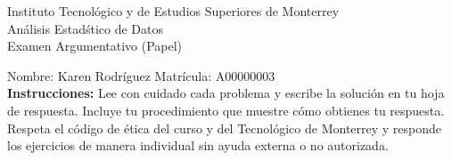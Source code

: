 \documentclass[10pt]{report}
\begin{document}
\newpage



\begin{center}
{\large Instituto Tecnol\'{o}gico y de Estudios Superiores de Monterrey \\
An\'alisis Estad\'stico de Datos } \\
Examen Argumentativo (Papel)
\end{center}

Nombre: \underline{\hspace*{.2in}}
Karen Rodríguez
\underline{\hspace*{.2in}} \quad Matr\'icula:\underline{\hspace*{.2in}}
A00000003
\underline{\hspace*{.2in}} \\

{\bf Instrucciones:} Lee con cuidado cada problema y escribe la soluci\'on
en tu hoja de respuesta. Incluye tu procedimiento que muestre c\'omo obtienes tu respuesta.  Respeta el c\'odigo de \'etica del curso y del Tecnol\'ogico de Monterrey y responde los ejercicios de manera individual sin ayuda externa o no autorizada.
\end{document}
